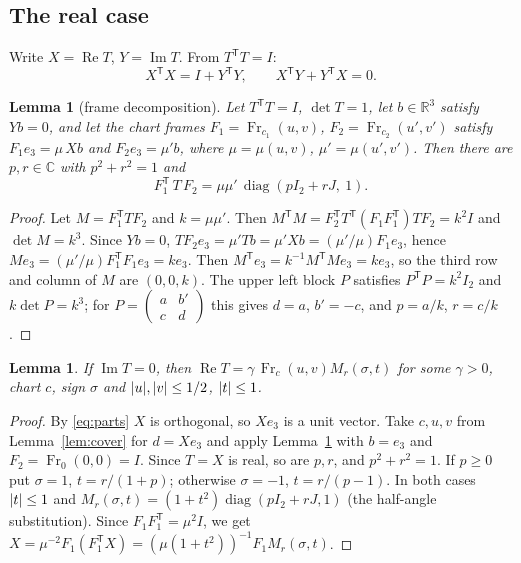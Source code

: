\documentclass[11pt]{article}
\newtheorem{lemma}[theorem]{Lemma}
\theoremstyle{definition}
\theoremstyle{remark}
\newcommand{\R}{\mathbb{R}}
\newcommand{\C}{\mathbb{C}}
\newcommand{\Fr}{\operatorname{Fr}}
\newcommand{\diag}{\operatorname{diag}}
\newcommand{\re}{\operatorname{Re}}
\newcommand{\im}{\operatorname{Im}}
\newcommand{\T}{\mathsf T}
\DeclarePairedDelimiter{\abs}{\lvert}{\rvert}
\begin{document}
\subsection{The real case}

Write $X=\re T$, $Y=\im T$. From $T^{\T}T=I$:
\begin{equation}\label{eq:parts}
  X^{\T}X=I+Y^{\T}Y,\qquad X^{\T}Y+Y^{\T}X=0 .
\end{equation}

\begin{lemma}[frame decomposition]\label{lem:frame}
Let $T^{\T}T=I$, $\det T=1$, let $b\in\R^3$ satisfy $Yb=0$, and let the chart frames
$F_1=\Fr_{c_1}(u,v)$, $F_2=\Fr_{c_2}(u',v')$ satisfy $F_1e_3=\mu\,Xb$ and $F_2e_3=\mu'b$, where
$\mu=\mu(u,v)$, $\mu'=\mu(u',v')$. Then there are $p,r\in\C$ with $p^2+r^2=1$ and
\[
  F_1^{\T}\,T\,F_2=\mu\mu'\,\diag(pI_2+rJ,\ 1).
\]
\end{lemma}

\begin{proof}
Let $M=F_1^{\T}TF_2$ and $k=\mu\mu'$. Then $M^{\T}M=F_2^{\T}T^{\T}(F_1F_1^{\T})TF_2=k^2I$ and
$\det M=k^3$. Since $Yb=0$, $TF_2e_3=\mu'Tb=\mu'Xb=(\mu'/\mu)F_1e_3$, hence
$Me_3=(\mu'/\mu)F_1^{\T}F_1e_3=ke_3$. Then $M^{\T}e_3=k^{-1}M^{\T}Me_3=ke_3$, so the third row and
column of $M$ are $(0,0,k)$. The upper left block $P$ satisfies $P^{\T}P=k^2I_2$ and
$k\det P=k^3$; for $P=\left(\begin{smallmatrix}a&b'\\c&d\end{smallmatrix}\right)$ this gives $d=a$,
$b'=-c$, and $p=a/k$, $r=c/k$.
\end{proof}

\begin{lemma}\label{lem:real}
If $\im T=0$, then $\re T=\gamma\,\Fr_c(u,v)M_r(\sigma,t)$ for some $\gamma>0$, chart $c$, sign $\sigma$
and $\abs u,\abs v\le1/2$, $\abs t\le1$.
\end{lemma}

\begin{proof}
By \eqref{eq:parts} $X$ is orthogonal, so $Xe_3$ is a unit vector. Take $c,u,v$ from
Lemma~\ref{lem:cover} for $d=Xe_3$ and apply Lemma~\ref{lem:frame} with $b=e_3$ and
$F_2=\Fr_0(0,0)=I$. Since $T=X$ is real, so are $p,r$, and $p^2+r^2=1$. If $p\ge0$ put $\sigma=1$,
$t=r/(1+p)$; otherwise $\sigma=-1$, $t=r/(p-1)$. In both cases $\abs t\le1$ and
$M_r(\sigma,t)=(1+t^2)\diag(pI_2+rJ,1)$ (the half-angle substitution). Since
$F_1F_1^{\T}=\mu^2I$, we get $X=\mu^{-2}F_1(F_1^{\T}X)=(\mu(1+t^2))^{-1}F_1M_r(\sigma,t)$.
\end{proof}
\end{document}
